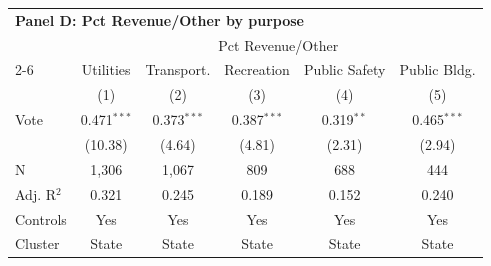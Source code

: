 \begingroup
\centering
\begin{tabular*}{\textwidth}{@{\extracolsep{\fill}}lccccc}
\multicolumn{6}{l}{\textbf{Panel D: Pct Revenue/Other by purpose}}\\
\addlinespace
   \toprule
    & \multicolumn{5}{c}{Pct Revenue/Other}\\
   \cmidrule(lr){2-6}
                  & Utilities     & Transport.    & Recreation    & Public Safety & Public Bldg. \\
                  & (1)           & (2)           & (3)           & (4)           & (5)\\
   \midrule
   Vote           & 0.471$^{***}$ & 0.373$^{***}$ & 0.387$^{***}$ & 0.319$^{**}$  & 0.465$^{***}$\\
                  & (10.38)      & (4.64)       & (4.81)       & (2.31)       & (2.94)\\
   \hline
   N   & 1,306         & 1,067         & 809           & 688           & 444\\
   Adj. R$^2$ & 0.321         & 0.245         & 0.189         & 0.152         & 0.240\\
   Controls                   & Yes & Yes & Yes & Yes & Yes\\
   Cluster              & State & State & State & State & State\\
   \bottomrule
\end{tabular*}
\par\endgroup
